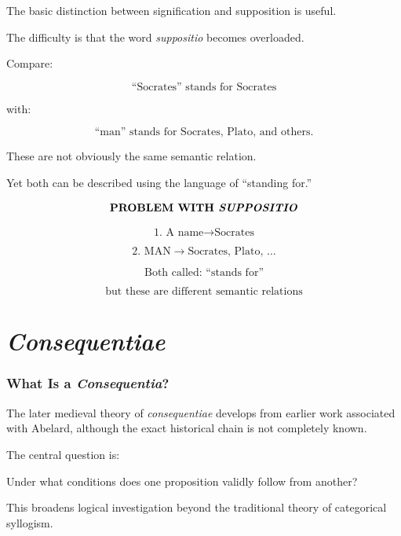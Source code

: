\documentclass[11pt]{article}
\newcommand{\latin}[1]{\textit{#1}}
\begin{document}
The basic distinction between signification and supposition is
useful.

The difficulty is that the word \latin{suppositio} becomes
overloaded.

Compare:

\[
\text{``Socrates'' stands for Socrates}
\]

with:

\[
\text{``man'' stands for Socrates, Plato, and others.}
\]

These are not obviously the same semantic relation.

Yet both can be described using the language of ``standing for.''

\begin{whiteboard}
\[
\textbf{PROBLEM WITH \latin{SUPPOSITIO}}
\]

\[
\text{1. A name} \rightarrow \text{Socrates}
\]

\[
\text{2. MAN} \rightarrow \text{Socrates, Plato, }\ldots
\]

\[
\text{Both called: ``stands for''}
\]

\[
\boxed{\text{but these are different semantic relations}}
\]
\end{whiteboard}


\part{\textit{Consequentiae}}

\section{What Is a \textit{Consequentia}?}

The later medieval theory of \latin{consequentiae} develops from
earlier work associated with Abelard, although the exact
historical chain is not completely known.

The central question is:

\begin{center}
Under what conditions does one proposition validly follow from
another?
\end{center}

This broadens logical investigation beyond the traditional theory
of categorical syllogism.
\end{document}

